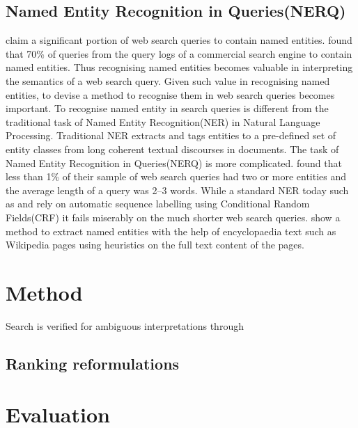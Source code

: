\documentclass[11pt]{article}
\begin{document}
\subsection{Named Entity Recognition in Queries(NERQ)}
\cite{guo2009named} \cite{DBLP:conf/cikm/Pasca07a} claim a 
significant portion of web search queries to contain named entities.
\cite{guo2009named} found that 70\% of queries from the query logs of a 
commercial search engine to contain named entities. Thus recognising named 
entities becomes valuable in interpreting the semantics of a web search 
query. Given such value in recognising named entities, to devise a method 
to recognise them in web search queries becomes important. To recognise
named entity in search queries is different from the traditional 
task of Named Entity Recognition(NER) in Natural Language Processing. 
Traditional NER extracts and tags entities to a pre-defined set of entity 
classes from long coherent textual discourses in documents. The task of 
Named Entity Recognition in Queries(NERQ) is more complicated. \cite{guo2009named} 
found that less than 1\% of their sample of web search queries had two or more 
entities and the average length of a query was 2--3 words. While a standard NER 
today such as \cite{finkel2005incorporating} and \cite{ratinov2009design} rely 
on automatic sequence labelling using Conditional Random Fields(CRF) it fails 
miserably on the much shorter web search queries. \cite{bunescu2006using} show 
a method to extract named entities with the help of encyclopaedia text such as 
Wikipedia pages using heuristics on the full text content of the pages.


\section{Method}
Search is verified for ambiguous interpretations \cite{cucerzan2007large} through 

\cite{DBLP:conf/cikm/Pasca07a}

\cite{auer2007dbpedia}
\label{sect:method}
\subsection{Ranking reformulations}
\label{ss:ranking}


\section{Evaluation}
\label{sect:eval}


\section{}
\label{s:layout}
\end{document}
